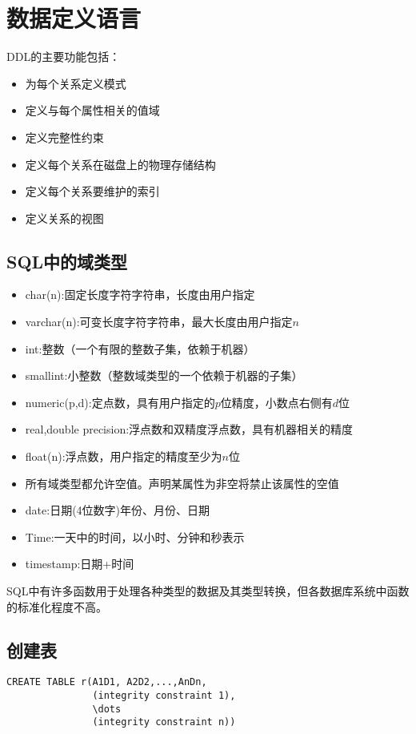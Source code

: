 \section{数据定义语言}
DDL的主要功能包括：
\begin{itemize}
    \item 为每个关系定义模式
    \item 定义与每个属性相关的值域
    \item 定义完整性约束
    \item 定义每个关系在磁盘上的物理存储结构
    \item 定义每个关系要维护的索引
    \item 定义关系的视图
\end{itemize}

\subsection{SQL中的域类型}

\begin{itemize}
    \item char(n):固定长度字符字符串，长度由用户指定
    \item varchar(n):可变长度字符字符串，最大长度由用户指定$n$
    \item int:整数（一个有限的整数子集，依赖于机器）
    \item smallint:小整数（整数域类型的一个依赖于机器的子集）
    \item numeric(p,d):定点数，具有用户指定的$p$位精度，小数点右侧有$d$位
    \item real,double precision:浮点数和双精度浮点数，具有机器相关的精度
    \item float(n):浮点数，用户指定的精度至少为$n$位
    \item 所有域类型都允许空值。声明某属性为非空将禁止该属性的空值
    \item date:日期(4位数字)年份、月份、日期
    \item Time:一天中的时间，以小时、分钟和秒表示
    \item timestamp:日期+时间
\end{itemize}

SQL中有许多函数用于处理各种类型的数据及其类型转换，但各数据库系统中函数的标准化程度不高。

\subsection{创建表}

\begin{lstlisting}[style=sqlstyle]
CREATE TABLE r(A1D1, A2D2,...,AnDn,
               (integrity constraint 1),
               \dots
               (integrity constraint n))    
\end{lstlisting}

